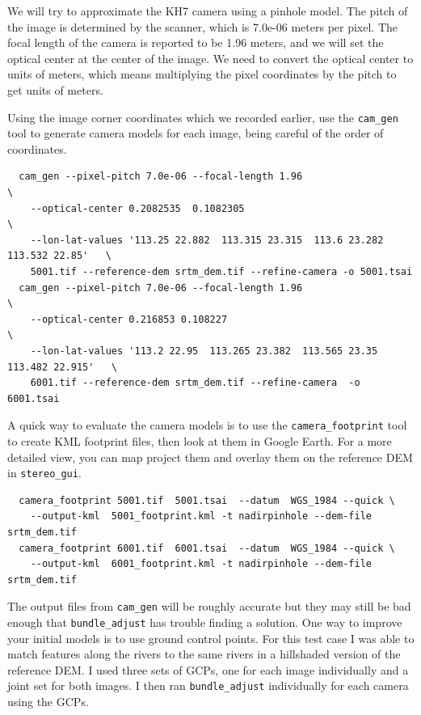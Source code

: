 We will try to approximate the KH7 camera using a pinhole model.
The pitch of the image is determined by the scanner, which is 7.0e-06 meters per pixel.
The focal length of the camera is reported to be 1.96 meters, and we will set the optical
center at the center of the image.  We need to convert the optical center to units of meters,
which means multiplying the pixel coordinates by the pitch to get units of meters.

Using the image corner coordinates which we recorded earlier, use the \texttt{cam\_gen}
tool to generate camera models for each image, being careful of the order of coordinates.

\begin{verbatim}
  cam_gen --pixel-pitch 7.0e-06 --focal-length 1.96                                 \
    --optical-center 0.2082535  0.1082305                                           \
    --lon-lat-values '113.25 22.882  113.315 23.315  113.6 23.282  113.532 22.85'   \
    5001.tif --reference-dem srtm_dem.tif --refine-camera -o 5001.tsai
  cam_gen --pixel-pitch 7.0e-06 --focal-length 1.96                                 \
    --optical-center 0.216853 0.108227                                              \
    --lon-lat-values '113.2 22.95  113.265 23.382  113.565 23.35  113.482 22.915'   \
    6001.tif --reference-dem srtm_dem.tif --refine-camera  -o 6001.tsai
\end{verbatim}


A quick way to evaluate the camera models is to use the \texttt{camera\_footprint} tool to
create KML footprint files, then look at them in Google Earth.  For a more detailed view,
you can map project them and overlay them on the reference DEM in \texttt{stereo\_gui}.

\begin{verbatim}
  camera_footprint 5001.tif  5001.tsai  --datum  WGS_1984 --quick \
    --output-kml  5001_footprint.kml -t nadirpinhole --dem-file srtm_dem.tif
  camera_footprint 6001.tif  6001.tsai  --datum  WGS_1984 --quick \
    --output-kml  6001_footprint.kml -t nadirpinhole --dem-file srtm_dem.tif
\end{verbatim}

The output files from \texttt{cam\_gen} will be roughly accurate but they may still be bad
enough that \texttt{bundle\_adjust} has trouble finding a solution.  One way to improve your
initial models is to use ground control points.  For this test case I was able to match
features along the rivers to the same rivers in a hillshaded version of the reference DEM.
I used three sets of GCPs, one for each image individually and a joint set for both images.
I then ran \texttt{bundle\_adjust} individually for each camera using the GCPs.

